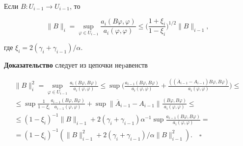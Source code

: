 \begin{lem} Если $B:U_{i-1}\to U_{i-1}$, то


$$


\| B \|_i=\sup_{\varphi\in U_{i-1}}


\frac{a_i(B\varphi,\varphi)}{a_i(\varphi,\varphi)}\leq


\biggl(\frac{1+\xi_i}{1-\xi_i}\biggr)^{1/2}\| B \|_{i-1},


$$


где $\xi_i=2(\gamma_i+\gamma_{i-1})/\alpha$.


\end{lem}





{\bf Доказательство} следует из цепочки неpавенств


\begin{multline}


\|B\|_i^2=\sup_{\varphi \in U_{i-1}}


\frac{a_i(B\varphi,B\varphi)}{a_i(\varphi,\varphi)}\leq


\sup\biggl(\frac{a_{i-1}(B\varphi,B\varphi)}{a_i(\varphi,\varphi)}+


\frac{((\overline A_{i-1}-A_{i-1})B\varphi,B\varphi)}


{a_i(\varphi,\varphi)}\biggr)\leq\\


\leq\sup\frac{1}{1-\xi_i}


\frac{a_{i-1}(B\varphi,B\varphi)}{a_{i-1}(\varphi,\varphi)}+


\sup \| \overline A_{i-1}-A_{i-1} \|


\frac{(B\varphi,B\varphi)}{a_i(\varphi,\varphi)}\leq\\


\leq(1-\xi_i)^{-1} \| B \|_{i-1}+2(\gamma_i+\gamma_{i-1})\alpha^{-1}


\sup\frac{a_{i-1}(B\varphi,B\varphi)}{a_i(\varphi,\varphi)}=\\


=(1-\xi_i)^{-1}(\|B\|_{i-1}^2+2(\gamma_i+\gamma_{i-1})/\alpha\|B\|_{i-1}^2).


\quad\square


\end{multline}





